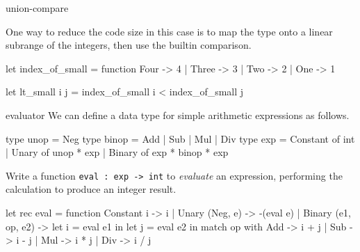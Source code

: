 \begin{exercise}{union-compare}
\begin{enumerate}
\begin{answer}
One way to reduce the code size in this case is to map the type onto a linear subrange of the
integers, then use the builtin comparison.

\begin{ocaml}
let index_of_small = function
   Four -> 4
 | Three -> 3
 | Two -> 2
 | One -> 1

let lt_small i j = index_of_small i < index_of_small j
\end{ocaml}
\fi\end{answer}
\end{enumerate}
\end{exercise}

%
\begin{exercise}{evaluator}
We can define a data type for simple arithmetic expressions as follows.

\begin{ocaml}
type unop = Neg
type binop = Add | Sub | Mul | Div
type exp =
   Constant of int
 | Unary of unop * exp
 | Binary of exp * binop * exp
\end{ocaml}
%
Write a function \hbox{\lstinline/eval : exp -> int/} to \emph{evaluate} an expression, performing the
calculation to produce an integer result.

\begin{answer}\ifanswers
\begin{ocaml}
let rec eval = function
   Constant i -> i
 | Unary (Neg, e) -> -(eval e)
 | Binary (e1, op, e2) ->
      let i = eval e1 in
      let j = eval e2 in
         match op with
            Add -> i + j
          | Sub -> i - j
          | Mul -> i * j
          | Div -> i / j
\end{ocaml}
\fi\end{answer}
\end{exercise}

